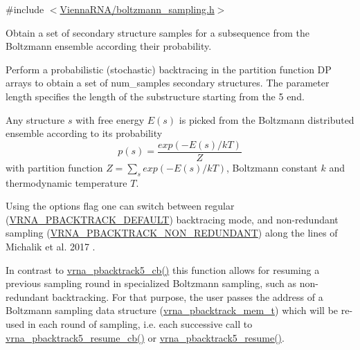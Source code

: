 {\ttfamily \#include $<$\mbox{\hyperlink{boltzmann__sampling_8h}{Vienna\+R\+N\+A/boltzmann\+\_\+sampling.\+h}}$>$}



Obtain a set of secondary structure samples for a subsequence from the Boltzmann ensemble according their probability. 

Perform a probabilistic (stochastic) backtracing in the partition function DP arrays to obtain a set of {\ttfamily num\+\_\+samples} secondary structures. The parameter {\ttfamily length} specifies the length of the substructure starting from the 5\textquotesingle{} end.

Any structure $ s $ with free energy $ E(s) $ is picked from the Boltzmann distributed ensemble according to its probability \[ p(s) = \frac{exp(-E(s) / kT)}{Z} \] with partition function $ Z = \sum_s exp(-E(s) / kT) $, Boltzmann constant $ k $ and thermodynamic temperature $ T $.

Using the {\ttfamily options} flag one can switch between regular (\mbox{\hyperlink{group__subopt__stochbt_ga760aa2fb2d5e3d7521a11454a21e9b9f}{V\+R\+N\+A\+\_\+\+P\+B\+A\+C\+K\+T\+R\+A\+C\+K\+\_\+\+D\+E\+F\+A\+U\+LT}}) backtracing mode, and non-\/redundant sampling (\mbox{\hyperlink{group__subopt__stochbt_ga9d580ce645aa0c38b69afdf56c332200}{V\+R\+N\+A\+\_\+\+P\+B\+A\+C\+K\+T\+R\+A\+C\+K\+\_\+\+N\+O\+N\+\_\+\+R\+E\+D\+U\+N\+D\+A\+NT}}) along the lines of Michalik et al. 2017 \cite{michalik:2017}.

In contrast to \mbox{\hyperlink{group__subopt__stochbt_ga626beb5b5b962d7e7c8433cd2cfd4e93}{vrna\+\_\+pbacktrack5\+\_\+cb()}} this function allows for resuming a previous sampling round in specialized Boltzmann sampling, such as non-\/redundant backtracking. For that purpose, the user passes the address of a Boltzmann sampling data structure (\mbox{\hyperlink{group__subopt__stochbt_gaa59c30efbed96bf9aaf8005584c72e63}{vrna\+\_\+pbacktrack\+\_\+mem\+\_\+t}}) which will be re-\/used in each round of sampling, i.\+e. each successive call to \mbox{\hyperlink{group__subopt__stochbt_ga4a91dc092580faf7799476e8dd76e0ac}{vrna\+\_\+pbacktrack5\+\_\+resume\+\_\+cb()}} or \mbox{\hyperlink{group__subopt__stochbt_gac5d7065196975b803daeb4e094ba1cb9}{vrna\+\_\+pbacktrack5\+\_\+resume()}}.

